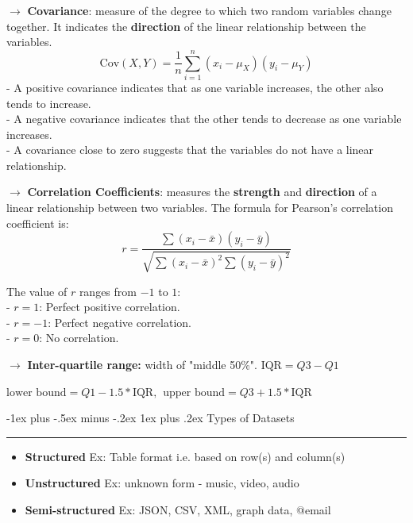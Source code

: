\documentclass[letterpaper, 10.5pt,landscape]{article}
\makeatletter
\renewcommand{\subsubsection}{\@startsection{subsubsection}{3}{0mm}%
                                {-1ex plus -.5ex minus -.2ex}%
                                {1ex plus .2ex}%
                                {\normalfont\small\bfseries}}
\makeatother
\begin{document}
\begin{multicols*}{3}
$\rightarrow$ \textbf{Covariance}: measure of the degree to which two random variables change together. It indicates the \textbf{direction} of the linear relationship between the variables.
\vspace{-3pt}
\[\boxed{\text{Cov}(X, Y) = \frac{1}{n} \sum_{i=1}^{n} (x_i - \mu_X)(y_i - \mu_Y)}\]
\hspace{10pt}-  A positive covariance indicates that as one variable increases, the other also tends to increase. \\
\hspace{10pt}- A negative covariance indicates that the other tends to decrease as one variable increases. \\
\hspace{10pt}- A covariance close to zero suggests that the variables do not have a linear relationship.

$\rightarrow$ \textbf{Correlation Coefficients}: measures the \textbf{strength} and \textbf{direction} of a linear relationship between two variables. The formula for Pearson's correlation coefficient is:
\vspace{-3pt}
\[
\boxed{r = \frac{\sum (x_i - \bar{x})(y_i - \bar{y})}{\sqrt{\sum (x_i - \bar{x})^2 \sum (y_i - \bar{y})^2}}}
\]

The value of $r$ ranges from $-1$ to $1$: \\
\hspace{10pt}- $r = 1$: Perfect positive correlation.  \\
\hspace{10pt}- $r = -1$: Perfect negative correlation. \\
\hspace{10pt}- $r = 0$: No correlation.


$\rightarrow$ \textbf{Inter-quartile range: } width of "middle 50\%".
\(\text{IQR} = Q3 - Q1\)

\(\text{lower bound} = Q1 - 1.5 * \text{IQR}, \hspace{5pt}
\text{upper bound} = Q3 + 1.5 * \text{IQR}\)



\subsubsection{Types of Datasets} {\color{teal}\hrule height 0.5pt} \smallskip

\begin{itemize}
    \item \textbf{Structured} Ex: Table format i.e. based on row(s) and column(s)
    \vspace{-3pt}
    \item \textbf{Unstructured} Ex: unknown form - music, video, audio 
    \vspace{-3pt}
    \item \textbf{Semi-structured} Ex: JSON, CSV, XML, graph data, @email
    \vspace{-3pt}
\end{itemize}



\end{multicols*}
\end{document}
